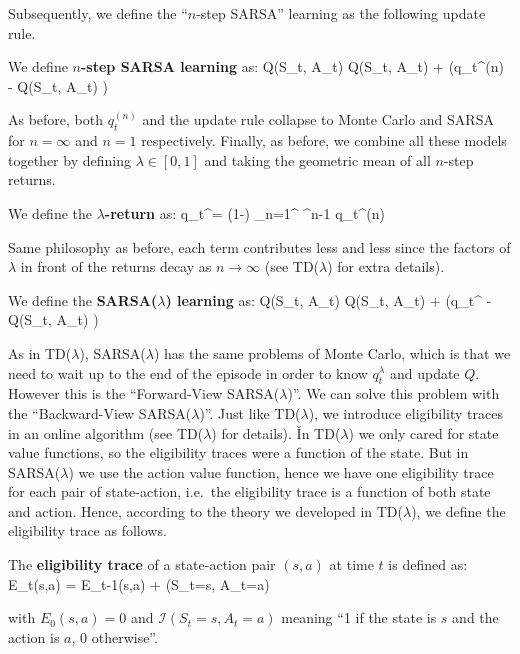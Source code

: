 Subsequently, we define the ``$n$-step SARSA'' learning as the following update rule.

We define \textbf{$n$-step SARSA learning} as:
\bse
Q(S_t, A_t) \gets Q(S_t, A_t) + \alpha \left(q_t^{(n)} - Q(S_t, A_t) \right)
\ese
\ed

As before, both $q_t^{(n)}$ and the update rule collapse to Monte Carlo and SARSA for $n=\infty$ and $n=1$
respectively. Finally, as before, we combine all these models together by defining $\lambda \in [0,1]$ and taking
the geometric mean of all $n$-step returns.

We define the \textbf{$\lambda$-return} as:
\bse
q_t^\lambda = (1-\lambda) \sum_{n=1}^{\infty} \lambda^{n-1} q_t^{(n)}
\ese
\ed

Same philosophy as before, each term contributes less and less since the factors of $\lambda$ in front of the
returns decay as $n \to \infty$ (see TD($\lambda$) for extra details).

We define the \textbf{SARSA($\lambda$) learning} as:
\bse
Q(S_t, A_t) \gets Q(S_t, A_t) + \alpha \left(q_t^{\lambda} - Q(S_t, A_t) \right)
\ese
\ed

As in TD($\lambda$), SARSA($\lambda$) has the same problems of Monte Carlo, which is that we need to wait up to the
end of the episode in order to know $q_t^\lambda$ and update $Q$. However this is the ``Forward-View
SARSA($\lambda$)''. We can solve this problem with the ``Backward-View SARSA($\lambda$)''. Just like TD($\lambda$),
we introduce eligibility traces in an online algorithm (see TD($\lambda$) for details). \v

In TD($\lambda$) we only cared for state value functions, so the eligibility traces were a function of the state.
But in SARSA($\lambda$) we use the action value function, hence we have one eligibility trace for each pair of
state-action, i.e.\ the eligibility trace is a function of both state and action. Hence, according to the theory we
developed in TD($\lambda$), we define the eligibility trace as follows.

The \textbf{eligibility trace} of a state-action pair $(s,a)$ at time $t$ is defined as:
\bse
E_t(s,a) = \gamma \lambda E_{t-1}(s,a) + (S_t=s, A_t=a)
\ese

with $E_0(s,a) = 0$ and $\mathcal{I}(S_t=s, A_t=a)$ meaning ``1 if the state is $s$ and the action is $a$, 0
otherwise''.
\ed

